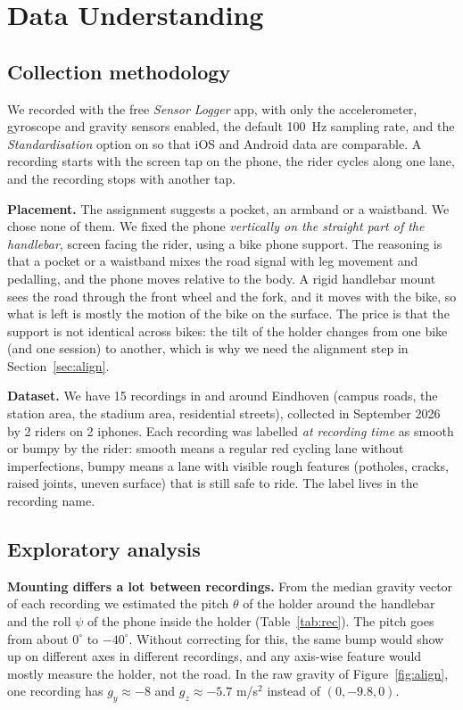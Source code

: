 \documentclass[10pt,a4paper]{article}
\begin{document}
\section{Data Understanding}

\subsection{Collection methodology}

We recorded with the free \emph{Sensor Logger} app, with only the accelerometer, gyroscope and gravity sensors enabled, the default 100~Hz sampling rate, and the \emph{Standardisation} option on so that iOS and Android data are comparable. A recording starts with the screen tap on the phone, the rider cycles along one lane, and the recording stops with another tap.

\textbf{Placement.} The assignment suggests a pocket, an armband or a waistband. We chose none of them. We fixed the phone \emph{vertically on the straight part of the handlebar}, screen facing the rider, using a bike phone support. The reasoning is that a pocket or a waistband mixes the road signal with leg movement and pedalling, and the phone moves relative to the body. A rigid handlebar mount sees the road through the front wheel and the fork, and it moves with the bike, so what is left is mostly the motion of the bike on the surface. The price is that the support is not identical across bikes: the tilt of the holder changes from one bike (and one session) to another, which is why we need the alignment step in Section~\ref{sec:align}. 


\textbf{Dataset.} We have 15 recordings in and around Eindhoven (campus roads, the station area, the stadium area, residential streets), collected in September 2026  by 2 riders on 2 iphones. Each recording was labelled \emph{at recording time} as smooth or bumpy by the rider: smooth means a regular red cycling lane without imperfections, bumpy means a lane with visible rough features (potholes, cracks, raised joints, uneven surface) that is still safe to ride. The label lives in the recording name. 

\subsection{Exploratory analysis}

\textbf{Mounting differs a lot between recordings.} From the median gravity vector of each recording we estimated the pitch $\theta$ of the holder around the handlebar and the roll $\psi$ of the phone inside the holder (Table~\ref{tab:rec}). The pitch goes from about $0^\circ$ to $-40^\circ$. Without correcting for this, the same bump would show up on different axes in different recordings, and any axis-wise feature would mostly measure the holder, not the road. In the raw gravity of Figure~\ref{fig:align}, one recording has $g_y\approx-8$ and $g_z\approx-5.7$ m/s$^2$ instead of $(0,-9.8,0)$.
\end{document}
